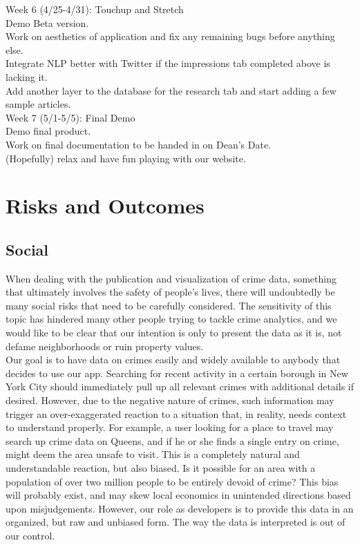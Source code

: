 \documentclass[paper=a4, fontsize=11pt]{scrartcl} %
\numberwithin{equation}{section} %
\numberwithin{figure}{section} %
\numberwithin{table}{section} %
\begin{document}
Week 6 (4/25-4/31): Touchup and Stretch \\
Demo Beta version. \\
Work on aesthetics of application and fix any remaining bugs before anything else. \\
Integrate NLP better with Twitter if the impressions tab completed above is lacking it. \\
Add another layer to the database for the research tab and start adding a few sample articles. \\

Week 7 (5/1-5/5): Final Demo \\
Demo final product. \\
Work on final documentation to be handed in on Dean's Date. \\
(Hopefully) relax and have fun playing with our website. 


\section{Risks and Outcomes}

\subsection{Social}

When dealing with the publication and visualization of crime data, something that ultimately involves the safety of people's lives, there will undoubtedly be many social risks that need to be carefully considered. The sensitivity of this topic has hindered many other people trying to tackle crime analytics, and we would like to be clear that our intention is only to present the data as it is, not defame neighborhoods or ruin property values. \\

Our goal is to have data on crimes easily and widely available to anybody that decides to use our app. Searching for recent activity in a certain borough in New York City should immediately pull up all relevant crimes with additional details if desired. However, due to the negative nature of crimes, such information may trigger an over-exaggerated reaction to a situation that, in reality, needs context to understand properly. For example, a user looking for a place to travel may search up crime data on Queens, and if he or she finds a single entry on crime, might deem the area unsafe to visit. This is a completely natural and understandable reaction, but also biased. Is it possible for an area with a population of over two million people to be entirely devoid of crime? This bias will probably exist, and may skew local economics in unintended directions based upon misjudgements. However, our role as developers is to provide this data in an organized, but raw and unbiased form. The way the data is interpreted is out of our control. \\
\end{document}
